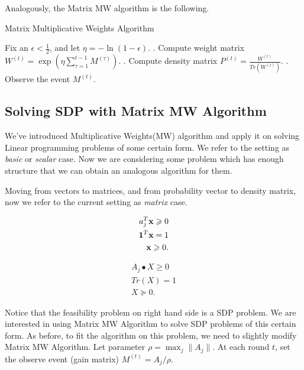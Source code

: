 \documentclass[12pt]{article}
\begin{document}
Analogously, the Matrix MW algorithm is the following.

\begin{algorithm}\label{MMWoriginal}
   \caption{Matrix Multiplicative Weights Algorithm}
    \begin{algorithmic}[]
      \State Fix an $\epsilon < \frac{1}{2}$, and let $\eta = -\ln(1-\epsilon)$. 
    . Compute weight matrix $W^{(t)} = \exp(\eta\sum_{\tau =1 }^{t-1} M^{(\tau)})$.
    . Compute density matrix $P^{(t)} = \frac{W^{(t)}}{Tr(W^{(t)})}$.
    . Observe the event $M^{(t)}$.
     \EndFor
\end{algorithmic}
\end{algorithm}

\FloatBarrier

\subsection{Solving SDP with Matrix MW Algorithm}
We've introduced Multiplicative Weights(MW) algorithm and apply it on solving Linear programming problems of some certain form. We refer to the setting as \textit{basic} or  \textit{scalar} case. Now we are considering some problem which has enough structure that we can obtain an analogous algorithm for them.

Moving from vectors to matrices, and from probability vector to density matrix, now we refer to the current setting as \textit{matrix} case. 

\begin{minipage}{0.5\linewidth}


\begin{align*}
a_j^T \textbf x \geqslant 0 \\
\mathbf 1^T\textbf x = 1 \\
\textbf x\geqslant 0.
\end{align*}

\end{minipage}
\begin{minipage}{0.5\linewidth}

\begin{align*}
A_j \bullet X \geqslant 0 \\
Tr(X) = 1 \\
X \succeq 0.
\end{align*}

\end{minipage}

Notice that the feasibility problem on right hand side is a SDP problem. We are interested in using Matrix MW Algorithm to solve SDP problems of this certain form. As before, to fit the algorithm on this problem, we need to slightly modify Matrix MW Algorithm. Let parameter $\rho = \max_j\|A_j\|$. At each round $t$, set the observe event (gain matrix) $M^{(t)} = A_j/\rho$. 
\end{document}
